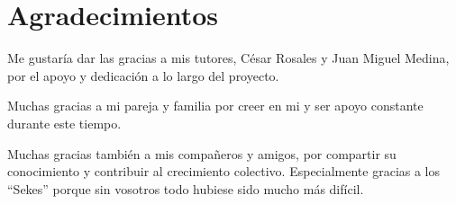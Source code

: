 




\begingroup
\let\clearpage\relax
\let\cleardoublepage\relax
\let\cleardoublepage\relax
\chapter*{Agradecimientos}

Me gustaría dar las gracias a mis tutores, César Rosales y Juan Miguel Medina, por el apoyo y dedicación a lo largo del proyecto.

Muchas gracias a mi pareja y familia por creer en mi y ser apoyo constante durante este tiempo.

Muchas gracias también a mis compañeros y amigos, por compartir su conocimiento y contribuir al crecimiento colectivo. Especialmente gracias a los ``Sekes'' porque sin vosotros todo hubiese sido mucho más difícil.

\endgroup
